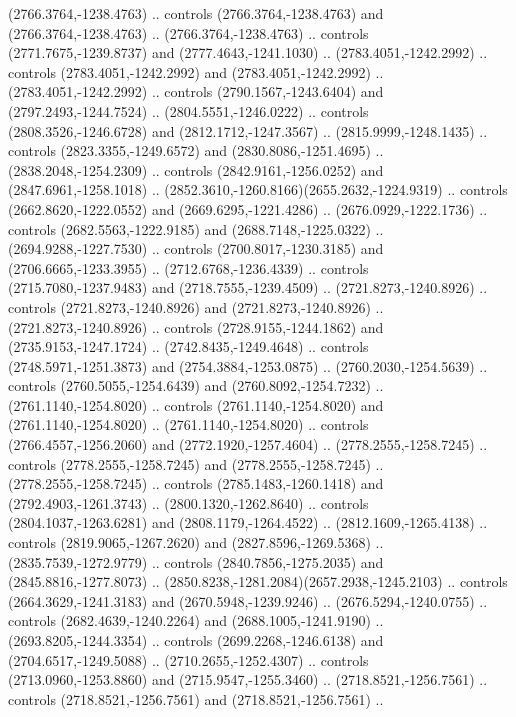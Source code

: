 \begin{scope}[shift={(28.3138,-376.6591)}]
\begin{scope}[shift={(-2186.6262,1813.8454)}]
      (2766.3764,-1238.4763) .. controls (2766.3764,-1238.4763) and
      (2766.3764,-1238.4763) .. (2766.3764,-1238.4763) .. controls
      (2771.7675,-1239.8737) and (2777.4643,-1241.1030) .. (2783.4051,-1242.2992) ..
      controls (2783.4051,-1242.2992) and (2783.4051,-1242.2992) ..
      (2783.4051,-1242.2992) .. controls (2790.1567,-1243.6404) and
      (2797.2493,-1244.7524) .. (2804.5551,-1246.0222) .. controls
      (2808.3526,-1246.6728) and (2812.1712,-1247.3567) .. (2815.9999,-1248.1435) ..
      controls (2823.3355,-1249.6572) and (2830.8086,-1251.4695) ..
      (2838.2048,-1254.2309) .. controls (2842.9161,-1256.0252) and
      (2847.6961,-1258.1018) .. (2852.3610,-1260.8166)(2655.2632,-1224.9319) ..
      controls (2662.8620,-1222.0552) and (2669.6295,-1221.4286) ..
      (2676.0929,-1222.1736) .. controls (2682.5563,-1222.9185) and
      (2688.7148,-1225.0322) .. (2694.9288,-1227.7530) .. controls
      (2700.8017,-1230.3185) and (2706.6665,-1233.3955) .. (2712.6768,-1236.4339) ..
      controls (2715.7080,-1237.9483) and (2718.7555,-1239.4509) ..
      (2721.8273,-1240.8926) .. controls (2721.8273,-1240.8926) and
      (2721.8273,-1240.8926) .. (2721.8273,-1240.8926) .. controls
      (2728.9155,-1244.1862) and (2735.9153,-1247.1724) .. (2742.8435,-1249.4648) ..
      controls (2748.5971,-1251.3873) and (2754.3884,-1253.0875) ..
      (2760.2030,-1254.5639) .. controls (2760.5055,-1254.6439) and
      (2760.8092,-1254.7232) .. (2761.1140,-1254.8020) .. controls
      (2761.1140,-1254.8020) and (2761.1140,-1254.8020) .. (2761.1140,-1254.8020) ..
      controls (2766.4557,-1256.2060) and (2772.1920,-1257.4604) ..
      (2778.2555,-1258.7245) .. controls (2778.2555,-1258.7245) and
      (2778.2555,-1258.7245) .. (2778.2555,-1258.7245) .. controls
      (2785.1483,-1260.1418) and (2792.4903,-1261.3743) .. (2800.1320,-1262.8640) ..
      controls (2804.1037,-1263.6281) and (2808.1179,-1264.4522) ..
      (2812.1609,-1265.4138) .. controls (2819.9065,-1267.2620) and
      (2827.8596,-1269.5368) .. (2835.7539,-1272.9779) .. controls
      (2840.7856,-1275.2035) and (2845.8816,-1277.8073) ..
      (2850.8238,-1281.2084)(2657.2938,-1245.2103) .. controls
      (2664.3629,-1241.3183) and (2670.5948,-1239.9246) .. (2676.5294,-1240.0755) ..
      controls (2682.4639,-1240.2264) and (2688.1005,-1241.9190) ..
      (2693.8205,-1244.3354) .. controls (2699.2268,-1246.6138) and
      (2704.6517,-1249.5088) .. (2710.2655,-1252.4307) .. controls
      (2713.0960,-1253.8860) and (2715.9547,-1255.3460) .. (2718.8521,-1256.7561) ..
      controls (2718.8521,-1256.7561) and (2718.8521,-1256.7561) ..

\end{scope}
\end{scope}
